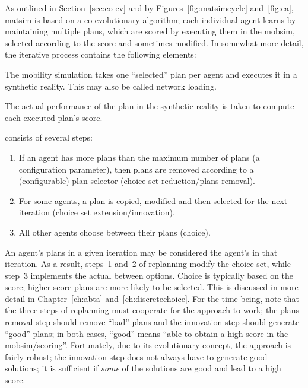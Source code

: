 As outlined in Section~\ref{sec:co-ev} and by Figures~\ref{fig:matsimcycle} and~\ref{fig:ea}, \gls{matsim} is based on a co-evolutionary algorithm; each individual agent learns by maintaining multiple plans, which are scored by executing them in the mobsim, selected according to the score and sometimes modified.  In somewhat more detail, the iterative process contains the following elements:
%
\begin{description}\styleDescription
\item[mobsim] The mobility simulation takes one ``selected'' plan per agent and executes it in a synthetic reality.  This may also be called network loading.

\item [scoring] The actual performance of the plan in the synthetic reality is taken to compute each executed plan's score.

\item [replanning] consists of several steps:
  \begin{enumerate}\styleEnumerate

  \item If an agent has more plans than the maximum number of plans (a configuration parameter), then plans are removed according to a (configurable) plan selector (choice set reduction/plans removal).

    \item For some agents, a plan is copied, modified and then selected for the next iteration (choice set extension/innovation).

  \item All other agents choose between their plans (choice).
  \end{enumerate}
\end{description}

An agent's plans in a given iteration may be considered the agent's  in that iteration.  As a result, steps~1 and~2 of replanning modify the choice set, while step~3 implements the actual  between options.
%
Choice is typically based on the score; higher score plans are more likely to be selected.  
%
This is discussed in more detail in Chapter~\ref{ch:abta} and~\ref{ch:discretechoice}.  For the time being, note that the three steps of replanning must cooperate for the approach to work; the plans removal step should remove ``bad'' plans and the innovation step should generate ``good'' plans; in both cases, ``good'' means ``able to obtain a high score in the mobsim/scoring''.  Fortunately, due to its evolutionary concept, the approach is fairly robust; the innovation step does not always have to generate good solutions; it is sufficient if \emph{some} of the solutions are good and lead to a high score.

